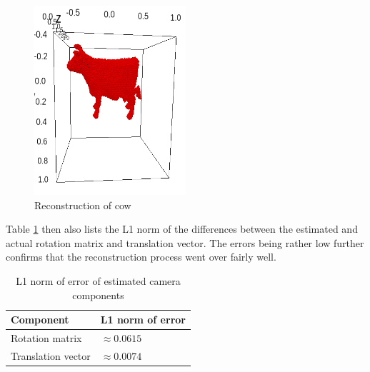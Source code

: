 \documentclass[a4paper]{scrreprt}
\begin{document}
\begin{figure}
		\centering
		\includegraphics[width=0.5\textwidth]{resources/cow.png}
		\caption{Reconstruction of cow}
		\label{fig:cow}
\end{figure}

Table \ref{tbl:errors} then also lists the L1 norm of the differences between
the estimated and actual rotation matrix and translation vector. The errors
being rather low further confirms that the reconstruction process went over
fairly well.

\begin{table}
		\centering
		\begin{tabular}{ll}
				\toprule
				Component & L1 norm of error \\
				\midrule
				Rotation matrix & $\approx 0.0615$ \\
				Translation vector & $\approx 0.0074$ \\
				\bottomrule
		\end{tabular}
		\caption{L1 norm of error of estimated camera components}
		\label{tbl:errors}
\end{table}

\printbibliography
\end{document}
